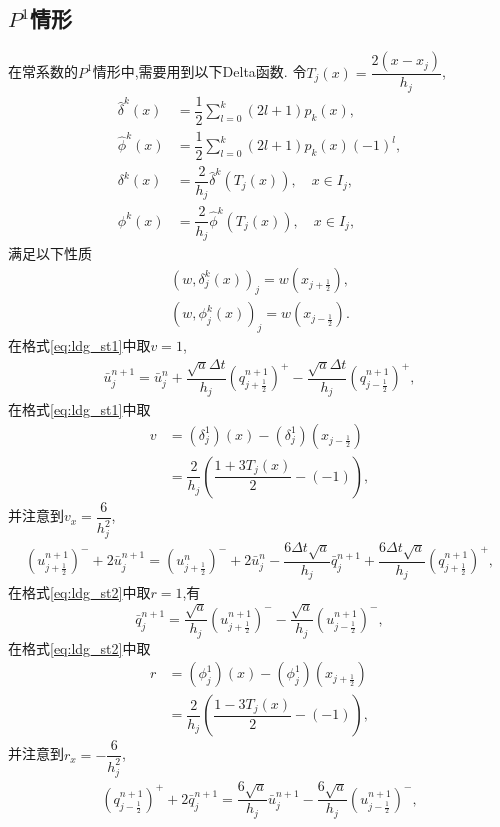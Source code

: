 \documentclass[a4paper, 11pt]{ctexart}
\numberwithin{equation}{section}
\numberwithin{figure}{section}
\begin{document}
\subsection{$P^1$情形}
在常系数的$P^1$情形中,需要用到以下Delta函数.
令$T_j(x)=\dfrac{2(x-x_j)}{h_j}$,
\begin{align}
  \hat\delta^k(x)&=\dfrac12\sum_{l=0}^k(2l+1)p_k(x),\\
  \hat\phi^k(x)&=\dfrac12\sum_{l=0}^k(2l+1)p_k(x)(-1)^l,\\
  \delta^k(x)&=\dfrac{2}{h_j}\hat\delta^k(T_j(x)),\quad x\in I_j,\\
  \phi^k(x)&=\dfrac{2}{h_j}\hat\phi^k(T_j(x)),\quad x\in I_j,
\end{align}
满足以下性质
\begin{align}
  (w,\delta^k_j(x))_j=w(x_{j+\frac12}),\\
  (w,\phi^k_j(x))_j=w(x_{j-\frac12}).
\end{align}
在格式\eqref{eq:ldg_st1}中取$v=1$,
\begin{align}
  \bar{u}^{n+1}_j=\bar{u}^{n}_j
  +\dfrac{\sqrt{a}\Delta t}{h_j}(q^{n+1}_{j+\frac12})^{+}
  -\dfrac{\sqrt{a}\Delta t}{h_j}(q^{n+1}_{j-\frac12})^{+},
  \label{eq:rel1}
\end{align}
在格式\eqref{eq:ldg_st1}中取
\begin{align*}
  v&=(\delta^1_j)(x)-(\delta^1_j)(x_{j-\frac12}) \\
  &=\dfrac{2}{h_j}(\dfrac{1+3T_j(x)}{2}-(-1)),
\end{align*}
并注意到$v_x=\dfrac{6}{h_j^2}$,
\begin{align}
  (u^{n+1}_{j+\frac12})^{-}+2\bar{u}^{n+1}_j=(u^{n}_{j+\frac12})^{-}+2\bar{u}^n_j
  -\dfrac{6\Delta t\sqrt{a}}{h_j}\bar{q}^{n+1}_j
  +\dfrac{6\Delta t\sqrt{a}}{h_j}({q}^{n+1}_{j+\frac12})^{+},
  \label{eq:rel2}
\end{align}
在格式\eqref{eq:ldg_st2}中取$r=1$,有
\begin{equation}
  \bar{q}^{n+1}_j=\dfrac{\sqrt{a}}{h_j}(u^{n+1}_{j+\frac12})^{-}-
  \dfrac{\sqrt{a}}{h_j}(u^{n+1}_{j-\frac12})^{-},
  \label{eq:rel3}
\end{equation}
在格式\eqref{eq:ldg_st2}中取
\begin{align*}
  r&=(\phi^1_j)(x)-(\phi^1_j)(x_{j+\frac12}) \\
  &=\dfrac{2}{h_j}(\dfrac{1-3T_j(x)}{2}-(-1)),
\end{align*}
并注意到$r_x=-\dfrac{6}{h_j^2}$,
\begin{align}
  (q^{n+1}_{j-\frac12})^{+}+2\bar{q}^{n+1}_j=
  \dfrac{6\sqrt{a}}{h_j}\bar{u}^{n+1}_j
  -\dfrac{6\sqrt{a}}{h_j}({u}^{n+1}_{j-\frac12})^{-},
  \label{eq:rel4}
\end{align}
\end{document}
